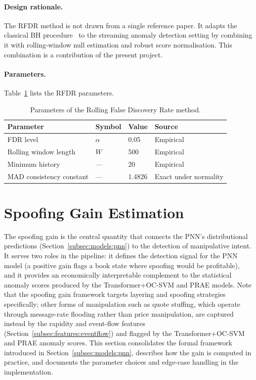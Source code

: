 \documentclass[11pt]{report}
\begin{document}
\paragraph{Design rationale.}
The RFDR method is not drawn from a single reference paper. It adapts the classical BH procedure~\cite{benjamini1995controlling} to the streaming anomaly detection setting by combining it with rolling-window null estimation and robust score normalisation. This combination is a contribution of the present project.

\paragraph{Parameters.}
Table~\ref{tab:rfdr_params} lists the RFDR parameters.

\begin{table}[H]
\centering
\caption{Parameters of the Rolling False Discovery Rate method.}
\label{tab:rfdr_params}
\begin{tabular}{llll}
\toprule
\textbf{Parameter} & \textbf{Symbol} & \textbf{Value} & \textbf{Source} \\
\midrule
FDR level & $\alpha$ & 0.05 & Empirical \\
Rolling window length & $W$ & 500 & Empirical \\
Minimum history & --- & 20 & Empirical \\
MAD consistency constant & --- & 1.4826 & Exact under normality \\
\bottomrule
\end{tabular}
\end{table}


\section{Spoofing Gain Estimation}\label{sec:methodology:spoofing}

The spoofing gain is the central quantity that connects the PNN's distributional predictions (Section~\ref{subsec:models:pnn}) to the detection of manipulative intent. It serves two roles in the pipeline: it defines the detection signal for the PNN model (a positive gain flags a book state where spoofing would be profitable), and it provides an economically interpretable complement to the statistical anomaly scores produced by the Transformer+OC-SVM and PRAE models. Note that the spoofing gain framework targets layering and spoofing strategies specifically; other forms of manipulation such as quote stuffing, which operate through message-rate flooding rather than price manipulation, are captured instead by the rapidity and event-flow features (Section~\ref{subsec:features:eventflow}) and flagged by the Transformer+OC-SVM and PRAE anomaly scores. This section consolidates the formal framework introduced in Section~\ref{subsec:models:pnn}, describes how the gain is computed in practice, and documents the parameter choices and edge-case handling in the implementation.
\end{document}
